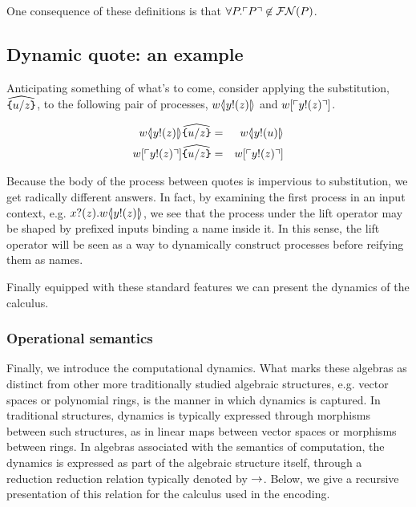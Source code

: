 \documentclass[12pt]{llncs}
\begin{document}
\begin{remark}\label{rem:no_self_referential_names}
  One consequence of these definitions is that $\forall P. \ulcorner P \urcorner
  \not\in \mathbin{\mathcal{FN}(P)}$.
\end{remark}

\subsection{ Dynamic quote: an example }

Anticipating something of what's to come, consider applying the
substitution, $\widehat{\texttt{\{}u / z \texttt{\}}}$, to the following pair
of processes, $w \langle\!| y!(z) |\!\rangle$ and $w[ \ulcorner y!(z) \urcorner ]$.

\begin{eqnarray}
	w \langle\!| y!(z) |\!\rangle\widehat{\texttt{\{}u / z \texttt{\}}}
		& = &
		w \langle\!| y!(u) |\!\rangle \nonumber\\
	w[ \ulcorner y!(z) \urcorner ] \widehat{ \texttt{\{}u / z \texttt{\}} }
		& = &
		w[ \ulcorner y!(z) \urcorner ] \nonumber
\end{eqnarray}

Because the body of the process between quotes is impervious to
substitution, we get radically different answers. In fact, by
examining the first process in an input context,
e.g. $x?(z).w \langle\!| y!(z) |\!\rangle$, we see that the process under the lift
operator may be shaped by prefixed inputs binding a name inside it. In
this sense, the lift operator will be seen as a way to dynamically
construct processes before reifying them as names.

Finally equipped with these standard features we can present the
dynamics of the calculus.

\subsubsection{Operational semantics} 

Finally, we introduce the computational dynamics. What marks these
algebras as distinct from other more traditionally studied algebraic
structures, e.g. vector spaces or polynomial rings, is the manner in
which dynamics is captured. In traditional structures, dynamics is typically
expressed through morphisms between such structures, as in linear maps
between vector spaces or morphisms between rings. In algebras
associated with the semantics of computation, the dynamics is
expressed as part of the algebraic structure itself, through a
reduction reduction relation typically denoted by $\rightarrow$. Below, we
give a recursive presentation of this relation for the calculus used
in the encoding.
\end{document}
